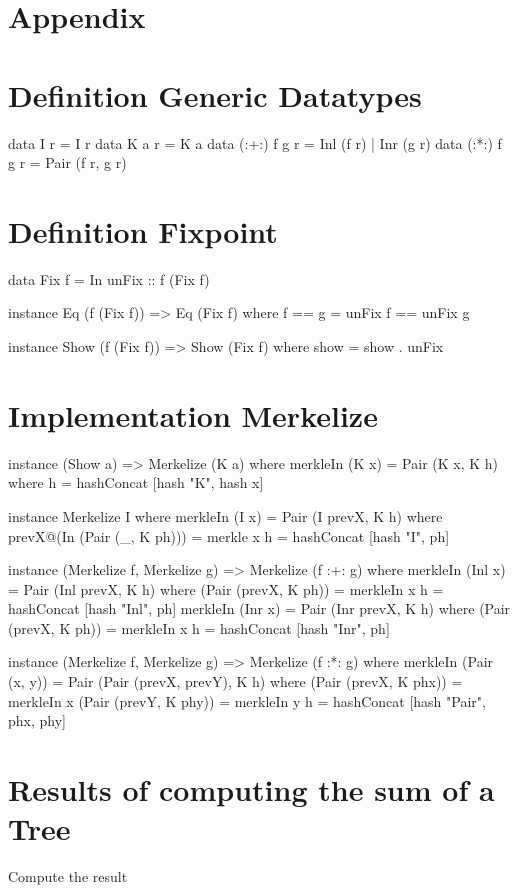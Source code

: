 \section{Appendix}
\appendix

\section{Definition Generic Datatypes}
\label{app-def-generic-datatypes}
\begin{haskell}
data I r         = I r                  
data K a r       = K a                  
data (:+:) f g r = Inl (f r) | Inr (g r)
data (:*:) f g r = Pair (f r, g r)      
\end{haskell}

\section{Definition Fixpoint}
\label{app-def-fixpoint}
\begin{haskell}
data Fix f = In { unFix :: f (Fix f) }

instance Eq (f (Fix f)) => Eq (Fix f) where
    f == g = unFix f == unFix g

instance Show (f (Fix f)) => Show (Fix f) where
    show = show . unFix
\end{haskell}

\section{Implementation Merkelize}
\label{app-impl-merkelize}
\begin{haskell}
instance (Show a) => Merkelize (K a) where
  merkleIn (K x) = Pair (K x, K h)
    where
      h = hashConcat [hash "K", hash x]

instance Merkelize I where
  merkleIn (I x) = Pair (I prevX, K h)
    where
      prevX@(In (Pair (_, K ph))) = merkle x
      h = hashConcat [hash "I", ph]

instance (Merkelize f, Merkelize g) => Merkelize (f :+: g) where
  merkleIn (Inl x) = Pair (Inl prevX, K h)
    where
      (Pair (prevX, K ph)) = merkleIn x
      h = hashConcat [hash "Inl", ph]
  merkleIn (Inr x) = Pair (Inr prevX, K h)
    where
      (Pair (prevX, K ph)) = merkleIn x
      h = hashConcat [hash "Inr", ph]

instance (Merkelize f, Merkelize g) => Merkelize (f :*: g) where
  merkleIn (Pair (x, y)) = Pair (Pair (prevX, prevY), K h)
    where
      (Pair (prevX, K phx)) = merkleIn x
      (Pair (prevY, K phy)) = merkleIn y
      h = hashConcat [hash "Pair", phx, phy]
\end{haskell}

\section{Results of computing the sum of a Tree}
\begin{table}[H]
  \centering
  
  
  \caption{Compute the result}
  \label{app-table-compute-result}
\end{table}
